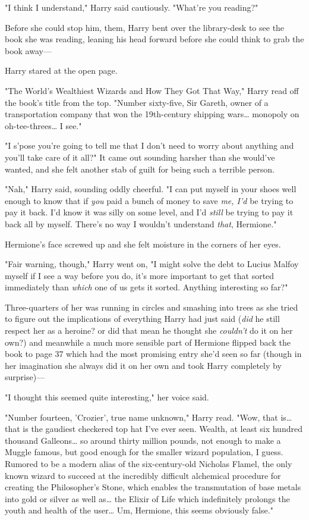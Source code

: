 "I think I understand," Harry said cautiously. "What're you reading?"

Before she could stop him, them, Harry bent over the library-desk to see the 
book she was reading, leaning his head forward before she could think to grab 
the book away---

Harry stared at the open page.

"The World's Wealthiest Wizards and How They Got That Way," Harry read off the 
book's title from the top. "Number sixty-five, Sir Gareth, owner of a 
transportation company that won the 19th-century shipping wars{\ldots} monopoly 
on oh-tee-threes{\ldots} I see."

"I s'pose you're going to tell me that I don't need to worry about anything and 
you'll take care of it all?" It came out sounding harsher than she would've 
wanted, and she felt another stab of guilt for being such a terrible person.

"Nah," Harry said, sounding oddly cheerful. "I can put myself in your shoes 
well enough to know that if \emph{you} paid a bunch of money to save \emph{me, 
I'd} be trying to pay it back. I'd know it was silly on some level, and I'd 
\emph{still} be trying to pay it back all by myself. There's no way I wouldn't 
understand \emph{that}, Hermione."

Hermione's face screwed up and she felt moisture in the corners of her eyes.

"Fair warning, though," Harry went on, "I might solve the debt to Lucius Malfoy 
myself if I see a way before you do, it's more important to get that sorted 
immediately than \emph{which} one of us gets it sorted. Anything interesting so 
far?"

Three-quarters of her was running in circles and smashing into trees as she 
tried to figure out the implications of everything Harry had just said 
(\emph{did} he still respect her as a heroine? or did that mean he thought she 
\emph{couldn't} do it on her own?) and meanwhile a much more sensible part of 
Hermione flipped back the book to page 37 which had the most promising entry 
she'd seen so far (though in her imagination she always did it on her own and 
took Harry completely by surprise)---

"I thought this seemed quite interesting," her voice said.

"Number fourteen, 'Crozier', true name unknown," Harry read. "Wow, that 
is{\ldots} that is the gaudiest checkered top hat I've ever seen. Wealth, at 
least six hundred thousand Galleons{\ldots} so around thirty million pounds, 
not enough to make a Muggle famous, but good enough for the smaller wizard 
population, I guess. Rumored to be a modern alias of the six-century-old 
Nicholas Flamel, the only known wizard to succeed at the incredibly difficult 
alchemical procedure for creating the Philosopher's Stone, which enables the 
transmutation of base metals into gold or silver as well as{\ldots} the Elixir 
of Life which indefinitely prolongs the youth and health of the user{\ldots} 
Um, Hermione, this seems obviously false."

